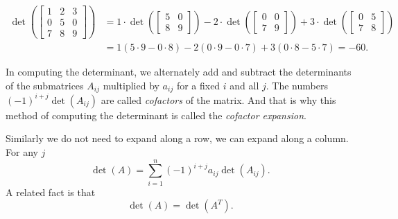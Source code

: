 \documentclass{ximera}
\begin{document}
\begin{equation*}
    \begin{split}
        \det 
        \left(
            \begin{bmatrix}
                1 & 2 & 3 \\
                0 & 5 & 0 \\
                7 & 8 & 9
            \end{bmatrix}
        \right)
        & = 1 \cdot \det 
        \left(
            \begin{bmatrix}
                5 & 0 \\
                8 & 9
            \end{bmatrix}
        \right)
        - 2 \cdot \det 
        \left(
            \begin{bmatrix}
                0 & 0 \\
                7 & 9
            \end{bmatrix}
        \right)
        + 3 \cdot \det 
        \left(
            \begin{bmatrix}
                0 & 5 \\
                7 & 8
            \end{bmatrix}
        \right) \\
        & = 1 (5 \cdot 9 - 0 \cdot 8) - 2 (0 \cdot 9 - 0 \cdot 7) + 3 (0 \cdot 8 - 5 \cdot 7) = -60 .
    \end{split}
\end{equation*}



In computing the determinant, we alternately add and subtract the determinants of the submatrices $A_{ij}$ multiplied by $a_{ij}$ for a fixed $i$ and all $j$. The numbers ${(-1)}^{i+j}\det(A_{ij})$ are called \emph{cofactors} of the matrix.  And that is why this method of computing the determinant is called the \emph{cofactor expansion}.

Similarly we do not need to expand along a row, we can expand along a column.  For any $j$
\begin{equation*}
    \det (A) = \sum_{i=1}^n {(-1)}^{i+j} a_{ij} \det (A_{ij}) .
\end{equation*}
A related fact is that
\begin{equation*}
    \det (A) = \det (A^T) .
\end{equation*}
\end{document}
